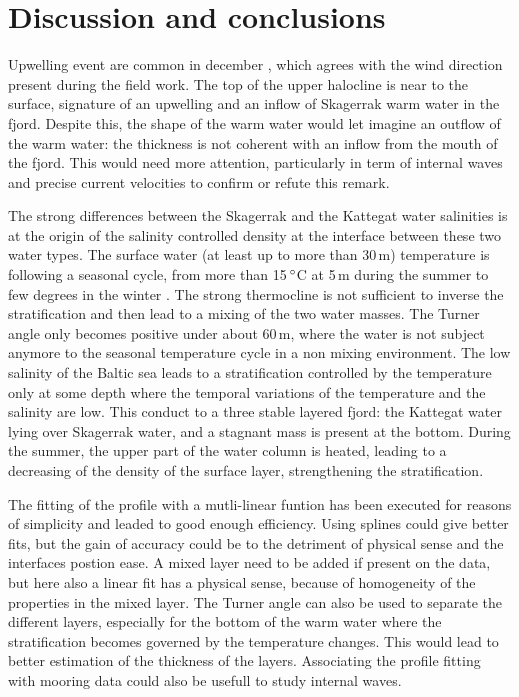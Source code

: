 \documentclass[12pt,a4paper]{article}
\begin{document}
\clearpage
\section{Discussion and conclusions}

Upwelling event are common in december \citep{bjork2003}, which agrees with
the wind direction present during the field work.
The top of the upper halocline is near to the surface,
signature of an upwelling and an inflow of Skagerrak warm water
in the fjord.
Despite this, the shape of the warm water would let imagine an outflow of
the warm water: the thickness is not coherent with an inflow
from the mouth of the fjord. This would need more attention,
particularly in term of internal waves and precise current velocities
to confirm or refute this remark.

The strong differences between the Skagerrak and the Kattegat water salinities
is at the origin of the salinity controlled density at the interface between
these two water types. The surface water (at least up to more than 30\,m)
temperature is following a seasonal cycle, from more than 15\,$^{\circ}$C
at 5\,m during the summer to few degrees in the winter \citep{bjork2003}.
The strong thermocline is not sufficient to inverse the stratification
and then lead to a mixing of the two water masses.
The Turner angle only becomes positive under about 60\,m,
where the water is not subject anymore to the seasonal temperature cycle in
a non mixing environment.
The low salinity of the Baltic sea leads to a stratification controlled
by the temperature only at some depth where the temporal variations
of the temperature and the salinity are low.
This conduct to a three stable layered fjord: the Kattegat water lying
over Skagerrak water, and a stagnant mass is present at the bottom.
During the summer, the upper part of the water column is heated,
leading to a decreasing of the density of the surface layer, strengthening
the stratification.

The fitting of the profile with a mutli-linear funtion has been executed
for reasons of simplicity and leaded to good enough efficiency.
Using splines could give better fits, but the gain of accuracy could
be to the detriment of physical sense and the interfaces postion ease.
A mixed layer need to be added
if present on the data, but here also a linear fit has a physical sense, because
of homogeneity of the properties in the mixed layer.
The Turner angle can also be used to separate the different layers,
especially for the bottom of the warm water where the stratification becomes
governed by the temperature changes.
This would lead to better estimation of the thickness of the layers.
Associating the profile fitting with mooring data could also
be usefull to study internal waves.
\end{document}
